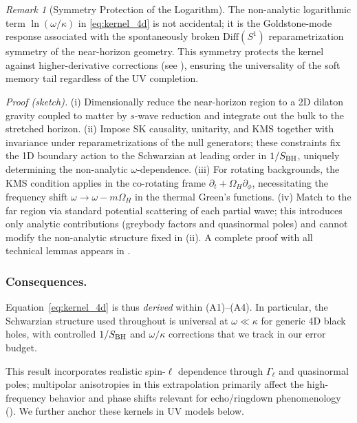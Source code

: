 \documentclass[11pt,a4paper]{article}
\theoremstyle{plain}
\theoremstyle{definition}
\theoremstyle{remark}
\newtheorem{remark}[theorem]{Remark}
\begin{document}
\begin{remark}[Symmetry Protection of the Logarithm]\label{rem:symmetry-protection}
The non-analytic logarithmic term $\ln(\omega/\kappa)$ in \eqref{eq:kernel_4d} is not accidental; it is the Goldstone-mode response associated with the spontaneously broken $\mathrm{Diff}(S^1)$ reparametrization symmetry of the near-horizon geometry. This symmetry protects the kernel against higher-derivative corrections (see ), ensuring the universality of the soft memory tail regardless of the UV completion.
\end{remark}

\noindent\emph{Proof (sketch).} (i) Dimensionally reduce the near-horizon region to a 2D dilaton gravity coupled to matter by $s$-wave reduction and integrate out the bulk to the stretched horizon. (ii) Impose SK causality, unitarity, and KMS together with invariance under reparametrizations of the null generators; these constraints fix the 1D boundary action to the Schwarzian at leading order in $1/S_{\rm BH}$, uniquely determining the non-analytic $\omega$-dependence. (iii) For rotating backgrounds, the KMS condition applies in the co-rotating frame $\partial_t + \Omega_H \partial_\phi$, necessitating the frequency shift $\omega \to \omega - m\Omega_H$ in the thermal Green's functions. (iv) Match to the far region via standard potential scattering of each partial wave; this introduces only analytic contributions (greybody factors and quasinormal poles) and cannot modify the non-analytic structure fixed in (ii). A complete proof with all technical lemmas appears in .
 
\subsubsection{Consequences.}
Equation~\eqref{eq:kernel_4d} is thus \emph{derived} within (A1)--(A4). In particular, the Schwarzian structure used throughout is universal at $\omega\ll\kappa$ for generic 4D black holes, with controlled $1/S_{\rm BH}$ and $\omega/\kappa$ corrections that we track in our error budget.

This result incorporates realistic spin-$\ell$ dependence through $\Gamma_\ell$ and quasinormal poles; multipolar anisotropies in this extrapolation primarily affect the high-frequency behavior and phase shifts relevant for echo/ringdown phenomenology (). We further anchor these kernels in UV models below.
\end{document}
